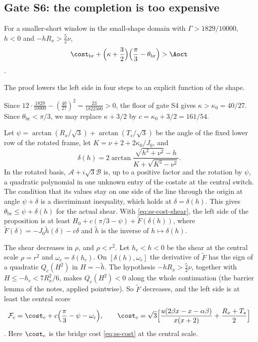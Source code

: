 \subsection{Gate S6: the completion is too expensive}\label{sec:ss-S6}

\begin{proposition}[Gate S6]\label{prop:ss-S6}
For a smaller-short window in the small-shape domain with $\Gamma>1829/10000$, $h<0$ and
$-hR_x>\frac52\nu$,
\[
  \cost_{\mathrm{br}}+\Bigl(\kappa+\frac32\Bigr)\Bigl(\frac\pi3-\theta_{\mathrm{br}}\Bigr)>\Aoct
\].
\end{proposition}

The proof lowers the left side in four steps to an explicit function of the shape.

 Since $12\cdot\frac{1829}{10000}-(\frac{40}{27})^2
=\frac{23}{1822500}>0$, the floor of gate S4 gives $\kappa>\kappa_0=40/27$. Since
$\theta_{\mathrm{br}}<\pi/3$, we may replace $\kappa+3/2$ by $c=\kappa_0+3/2=161/54$.

 Let $\psi=\arctan(R_x/\sqrt3)+\arctan(T_s/\sqrt3)$
be the angle of the fixed lower row of the rotated frame, let $K=\nu+2+2\kappa_0/J_0$, and
\[
  \delta(h)=2\arctan\frac{\sqrt{h^2+\nu^2}-h}{K+\sqrt{K^2-\nu^2}}.
\]
In the rotated basis, $\mathcal A+i\sqrt3\mathcal B$ is, up to a positive factor and the rotation
by $\psi$, a quadratic polynomial in one unknown entry of the costate at the central switch. The
condition that its values stay on one side of the line through the origin at angle $\psi+\delta$
is a discriminant inequality, which holds at $\delta=\delta(h)$. This gives
$\theta_{\mathrm{br}}\le\psi+\delta(h)$ for the actual shear. With
\eqref{eq:ss-cost-shear}, the left side of the proposition is at least
$H_0+c(\pi/3-\psi)+\tilde F(\delta(h))$, where $\tilde F(\delta)=-J_0\tilde h(\delta)-c\delta$ and
$\tilde h$ is the inverse of $h\mapsto\delta(h)$.

 The shear decreases in $\rho$, and $\rho<r^2$.
Let $h_c<h<0$ be the shear at the central scale $\rho=r^2$ and $\omega_c=\delta(h_c)$. On
$[\delta(h),\omega_c]$ the derivative of $\tilde F$ has the sign of a quadratic $Q_c(H^2)$ in
$H=-\tilde h$. The hypothesis $-hR_x>\frac52\nu$, together with $H\le-h_c<7R_x^2/6$, makes
$Q_c(H^2)<0$ along the whole continuation (the barrier lemma of the notes, applied pointwise). So
$\tilde F$ decreases, and the left side is at least the central score
\[
  \mathcal F_c=\cost_c+c\Bigl(\frac\pi3-\psi-\omega_c\Bigr),\qquad
  \cost_c=\sqrt3\Bigl[\frac{u(2\beta x-x-\alpha\beta)}{x(x+2)}+\frac{R_x+T_s}{2}\Bigr]
\]. Here $\cost_c$ is the bridge cost \eqref{eq:ss-cost} at the
central scale.

